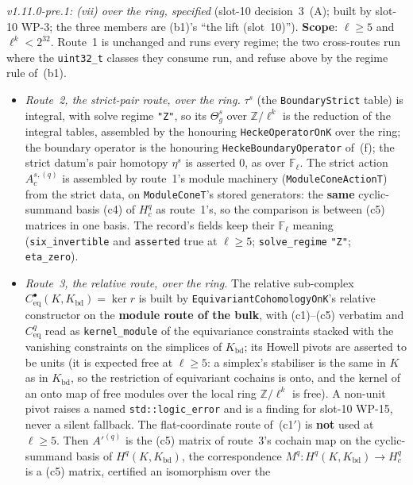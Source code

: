 \documentclass[11pt]{article}
\theoremstyle{remark}
\newcommand{\F}{\mathbb{F}}
\newcommand{\Z}{\mathbb{Z}}
\newcommand{\Fl}{\F_\ell}
\begin{document}
\begin{itemize}
  \emph{v1.11.0-pre.1: (vii) over the ring, specified} (slot-10 decision~3~(A); built by slot-10
  WP-3; the three members are (b1)'s ``the lift (slot~10)''). \textbf{Scope}: $\ell\ge5$ and
  $\ell^k<2^{32}$. Route~1 is unchanged and runs every regime; the two cross-routes run where the
  \texttt{uint32\_t} classes they consume run, and refuse above by the regime rule of~(b1).
  \begin{itemize}
  \item \emph{Route~2, the strict-pair route, over the ring.} $\tau^{s}$ (the
    \texttt{BoundaryStrict} table) is integral, with solve regime \texttt{"Z"}, so its $\Theta^{s}_g$
    over $\Z/\ell^k$ is the reduction of the integral tables, assembled by the honouring
    \texttt{HeckeOperatorOnK} over the ring; the boundary operator is the honouring
    \texttt{HeckeBoundaryOperator} of~(f); the strict datum's pair homotopy $\eta^{s}$ is asserted
    $0$, as over $\Fl$. The strict action $A^{s,(q)}_c$ is assembled by route~1's module machinery
    (\texttt{ModuleConeActionT}) from the strict data, on \texttt{ModuleConeT}'s stored generators:
    the \textbf{same} cyclic-summand basis (c4) of $H^q_c$ as route~1's, so the comparison is between
    (c5) matrices in one basis. The record's fields keep their $\Fl$ meaning
    (\texttt{six\_invertible} and \texttt{asserted} true at $\ell\ge5$; \texttt{solve\_regime}
    \texttt{"Z"}; \texttt{eta\_zero}).
  \item \emph{Route~3, the relative route, over the ring.} The relative sub-complex
    $C^{\bullet}_{\mathrm{eq}}(K,K_{\mathrm{bd}})=\ker r$ is built by
    \texttt{EquivariantCohomologyOnK}'s relative constructor on the \textbf{module route of
    the bulk}, with (c1)--(c5) verbatim and $C^q_{\mathrm{eq}}$ read as
    \texttt{kernel\_module} of the equivariance constraints stacked with the vanishing constraints
    on the simplices of $K_{\mathrm{bd}}$; its Howell pivots are asserted to be units (it is expected
    free at $\ell\ge5$: a simplex's stabiliser is the same in $K$ as in $K_{\mathrm{bd}}$, so the
    restriction of equivariant cochains is onto, and the kernel of an onto map of free modules over
    the local ring $\Z/\ell^k$ is free). A non-unit pivot raises a named \texttt{std::logic\_error} and
    is a finding for slot-10 WP-15, never a silent fallback. The flat-coordinate route of~(c1$'$) is
    \textbf{not} used at $\ell\ge5$. Then $A'^{(q)}$ is the (c5) matrix of route~3's cochain map on
    the cyclic-summand basis of $H^q(K,K_{\mathrm{bd}})$, the correspondence
    $M^q\colon H^q(K,K_{\mathrm{bd}})\to H^q_c$ is a (c5) matrix, certified an isomorphism over the

\end{itemize}
\end{itemize}
\end{document}
